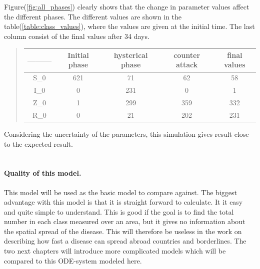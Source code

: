 \documentclass[%
twoside,                 %
final,                   %
10pt]{article}
\begin{document}
Figure(\ref{fig:all_phases}) clearly shows that the change in parameter values affect the different phases. The different values are shown in the table(\ref{table:class_values}), where the values are given at the initial time. The last column consist of the final values after 34 days.

\begin{quote}
\begin{tabular}{ccccc}
\hline
\multicolumn{1}{c}{ --------- } & \multicolumn{1}{c}{ Initial phase } & \multicolumn{1}{c}{ hysterical phase } & \multicolumn{1}{c}{ counter attack } & \multicolumn{1}{c}{ final values } \\
\hline
S_0              & 621              & 71               & 62               & 58               \\
I_0              & 0                & 231              & 0                & 1                \\
Z_0              & 1                & 299              & 359              & 332              \\
R_0              & 0                & 21               & 202              & 231              \\
\hline
\end{tabular}
\end{quote}

\noindent

Considering the uncertainty of the parameters, this simulation gives result close to the expected result. 
\\
\\
\paragraph{Quality of this model.}
This model will be used as the basic model to compare against. The biggest advantage with this model is that it is straight forward to calculate. It it easy and quite simple to understand. This is good if the goal is to find the total number in each class measured over an area, but it gives no information about the spatial spread of the disease. This will therefore be useless in the work on describing how fast a disease can spread abroad countries and borderlines. The two next chapters will introduce more complicated models which will be compared to this ODE-system modeled here.








\printindex
\end{document}
